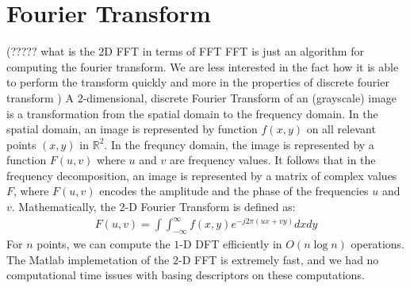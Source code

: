 \documentclass{report}
\begin{document}
\section{Fourier Transform} (????? what is the 2D FFT in terms of FFT {\color{red} FFT is just an algorithm for computing the fourier transform. We are less interested in the fact how it is able to perform the transform quickly and more in the properties of discrete fourier transform })
A $2$-dimensional, discrete Fourier Transform of an (grayscale) image is a transformation from the spatial domain to the frequency domain. In the spatial domain, an image is represented by function $f(x,y)$ on all relevant points $(x,y)$ in  $\mathbb{R}^2$. In the frequncy domain, the image is represented by a function $F(u,v)$ where $u$ and $v$ are frequency values. It follows that in the frequency decomposition, an image is represented by a matrix of complex values $F$, where $F(u,v)$ encodes the amplitude and the phase of the frequencies $u$ and $v$. Mathematically, the $2$-D Fourier Transform is defined as:
\begin{eqnarray}
F(u,v) = \int \int ^{\infty}_{-\infty} f(x,y)e^{-j2\pi (ux+vy)}dx dy
\end{eqnarray}
For $n$ points, we can compute the $1$-D DFT efficiently in $O(n\log{n})$ operations. The Matlab implemetation of the $2$-D FFT is extremely  fast, and we had no computational time issues with basing descriptors on these computations.
\end{document}
